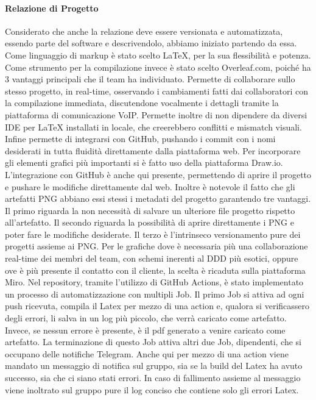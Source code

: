     \paragraph{Relazione di Progetto}
        Considerato che anche la relazione deve essere versionata e automatizzata, essendo parte del software e descrivendolo, abbiamo iniziato partendo da essa. 
        Come linguaggio di markup è stato scelto {\LaTeX}, per la sua flessibilità e potenza. 
        Come strumento per la compilazione invece è stato scelto Overleaf.com, poiché ha 3 vantaggi principali che il team ha individuato. Permette di collaborare sullo stesso progetto, in real-time, osservando i cambiamenti fatti dai collaboratori con la compilazione immediata, discutendone vocalmente i dettagli tramite la piattaforma di comunicazione VoIP. Permette inoltre di non dipendere da diversi IDE per {\LaTeX} installati in locale, che creerebbero conflitti e mismatch visuali. Infine permette di integrarsi con GitHub, pushando i commit con i nomi desiderati in tutta fluidità direttamente dalla piattaforma web.
        Per incorporare gli elementi grafici più importanti si è fatto uso della piattaforma Draw.io. L'integrazione con GitHub è anche qui presente, permettendo di aprire il progetto e pushare le modifiche direttamente dal web. Inoltre è notevole il fatto che gli artefatti PNG abbiano essi stessi i metadati del progetto garantendo tre vantaggi. Il primo riguarda la non necessità di salvare un ulteriore file progetto rispetto all'artefatto. Il secondo riguarda la possibilità di aprire direttamente i PNG e poter fare le modifiche desiderate. Il terzo è l'intrinseco versionamento pure dei progetti assieme ai PNG. 
        Per le grafiche dove è necessaria più una collaborazione real-time dei membri del team, con schemi inerenti al DDD più esotici, oppure ove è più presente il contatto con il cliente, la scelta è ricaduta sulla piattaforma Miro.
        Nel repository, tramite l'utilizzo di GitHub Actions, è stato implementato un processo di automatizzazione con multipli Job. 
        Il primo Job si attiva ad ogni push ricevuta, compila il Latex per mezzo di una action e, qualora si verificassero degli errori, li salva in un log più piccolo, che verrà caricato come artefatto. Invece, se nessun errore è presente, è il pdf generato a venire caricato come artefatto.
        La terminazione di questo Job attiva altri due Job, dipendenti, che si occupano delle notifiche Telegram. Anche qui per mezzo di una action viene mandato un messaggio di notifica sul gruppo, sia se la build del Latex ha avuto successo, sia che ci siano stati errori. In caso di fallimento assieme al messaggio viene inoltrato sul gruppo pure il log conciso che contiene solo gli errori Latex. 
